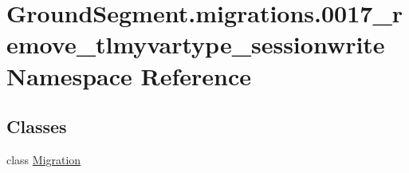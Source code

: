 \hypertarget{namespace_ground_segment_1_1migrations_1_10017__remove__tlmyvartype__sessionwrite}{}\section{Ground\+Segment.\+migrations.0017\+\_\+remove\+\_\+tlmyvartype\+\_\+sessionwrite Namespace Reference}
\label{namespace_ground_segment_1_1migrations_1_10017__remove__tlmyvartype__sessionwrite}
\subsection*{Classes}
\begin{DoxyCompactItemize}
\item 
class \hyperlink{class_ground_segment_1_1migrations_1_10017__remove__tlmyvartype__sessionwrite_1_1_migration}{Migration}
\end{DoxyCompactItemize}

